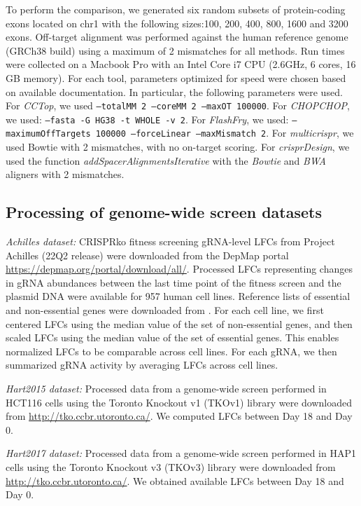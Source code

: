 \documentclass[pdftex,english,10pt]{article}
\begin{document}
{To perform the comparison, we generated six random subsets of protein-coding exons located on chr1 with the following sizes:100, 200, 400, 800, 1600 and 3200 exons.
Off-target alignment was performed against the human reference genome (GRCh38 build) using a maximum of 2 mismatches for all methods.  Run times were collected on a Macbook Pro with an Intel Core i7 CPU (2.6GHz, 6 cores, 16 GB memory). For each tool, parameters optimized for speed were chosen based on available documentation. In particular, the following parameters were used. For \textit{CCTop}, we used \texttt{--totalMM 2 --coreMM 2 --maxOT 100000}. For \textit{CHOPCHOP}, we used: \texttt{--fasta -G HG38 -t WHOLE -v 2}. For \textit{FlashFry}, we used: \texttt{--maximumOffTargets 100000 --forceLinear --maxMismatch 2}. For \textit{multicrispr}, we used Bowtie with 2 mismatches, with no on-target scoring. For \textit{crisprDesign}, we used the function \textit{addSpacerAlignmentsIterative} with the \textit{Bowtie} and \textit{BWA} aligners with 2 mismatches. 




\subsection*{Processing of genome-wide screen datasets}

\textit{Achilles dataset:} CRISPRko fitness screening gRNA-level LFCs from Project Achilles (22Q2 release) were downloaded from the DepMap portal \url{https://depmap.org/portal/download/all/}. Processed LFCs representing changes in gRNA abundances between the last time point of the fitness screen and the plasmid DNA were available for 957 human cell lines. Reference lists of essential and non-essential genes were downloaded from \citet{hart2014}.
For each cell line, we first centered LFCs using the median value of the set of non-essential genes, and then scaled LFCs using the median value of the set of essential genes. This enables normalized LFCs to be comparable across cell lines. For each gRNA, we then summarized gRNA activity by averaging LFCs across cell lines. 

\textit{Hart2015 dataset:} Processed data from a genome-wide screen performed in HCT116 cells  using the Toronto Knockout v1 (TKOv1) library \citep{toronto1} were downloaded from \url{http://tko.ccbr.utoronto.ca/}. We computed LFCs between Day 18 and Day 0. 

\textit{Hart2017 dataset:} Processed data from a genome-wide screen performed in HAP1 cells using the Toronto Knockout v3 (TKOv3) library \citep{toronto3} were downloaded from \url{http://tko.ccbr.utoronto.ca/}. We obtained available LFCs between Day 18 and Day 0.

}
\end{document}
